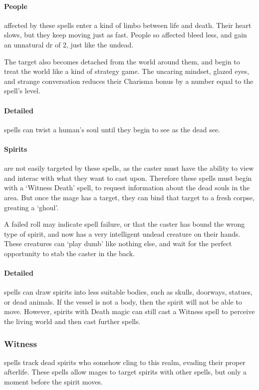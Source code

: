 \begin{multicols}{2}
\paragraph{People}
affected by these spells enter a kind of limbo between life and death.
Their heart slows, but they keep moving just as fast.
People so affected bleed less, and gain an unnatural \gls{dr} of 2, just like the undead.

The target also becomes detached from the world around them, and begin to treat the world like a kind of strategy game.
The uncaring mindset, glazed eyes, and strange conversation reduces their Charisma bonus by a number equal to the spell's level.

\paragraph{Detailed}
spells can twist a human's soul until they begin to see as the dead see.%

\paragraph{Spirits}
    are not easily targeted by these spells, as the caster must have the ability to view and interac with what they want to cast upon.
    Therefore these spells must begin with a `Witness Death' spell, to request information about the dead souls in the area.
    But once the mage has a target, they can bind that target to a fresh corpse, greating a `ghoul'.

    A failed roll may indicate spell failure, or that the caster has bound the wrong type of spirit, and now has a very intelligent undead creature on their hands.
    These creatures can `play dumb' like nothing else, and wait for the perfect opportunity to stab the caster in the back.

\paragraph{Detailed}
spells can draw spirits into less suitable bodies, such as skulls, doorways, statues, or dead animals.
If the vessel is not a body, then the spirit will not be able to move.
However, spirits with Death magic can still cast a Witness spell to perceive the living world and then cast further spells.

\subsubsection{Witness}
spells track dead spirits who somehow cling to this realm, evading their proper afterlife.%
These spells allow mages to target spirits with other spells, but only a moment before the spirit moves.


\end{multicols}
